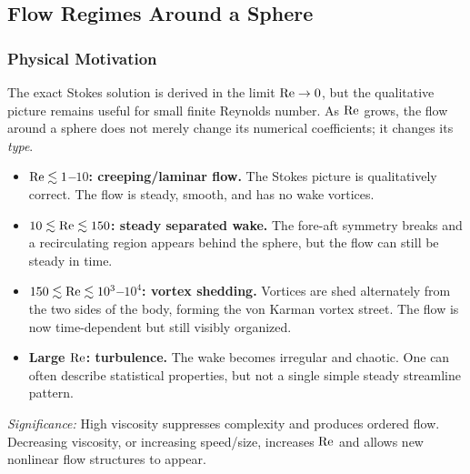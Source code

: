 \documentclass[../main.tex]{subfiles}
\begin{document}
\subsection{Flow Regimes Around a Sphere}\label{sec:lec22:reynolds-regimes}

\subsubsection*{Physical Motivation}
The exact Stokes solution is derived in the limit $\mathrm{Re}\to0$, but the
qualitative picture remains useful for small finite Reynolds number. As
$\mathrm{Re}$ grows, the flow around a sphere does not merely change its numerical
coefficients; it changes its \emph{type}.

\begin{itemize}
  \item \textbf{$\mathrm{Re}\lesssim1$--$10$: creeping/laminar flow.} The Stokes
  picture is qualitatively correct. The flow is steady, smooth, and has no wake
  vortices.

  \item \textbf{$10\lesssim\mathrm{Re}\lesssim150$: steady separated wake.} The
  fore-aft symmetry breaks and a recirculating region appears behind the sphere,
  but the flow can still be steady in time.

  \item \textbf{$150\lesssim\mathrm{Re}\lesssim10^3$--$10^4$: vortex shedding.}
  Vortices are shed alternately from the two sides of the body, forming the
  von Karman vortex street. The flow is now time-dependent but still visibly
  organized.

  \item \textbf{Large $\mathrm{Re}$: turbulence.} The wake becomes irregular and
  chaotic. One can often describe statistical properties, but not a single
  simple steady streamline pattern.
\end{itemize}


\textit{Significance:} High viscosity suppresses complexity and produces
ordered flow. Decreasing viscosity, or increasing speed/size, increases
$\mathrm{Re}$ and allows new nonlinear flow structures to appear.
\end{document}
